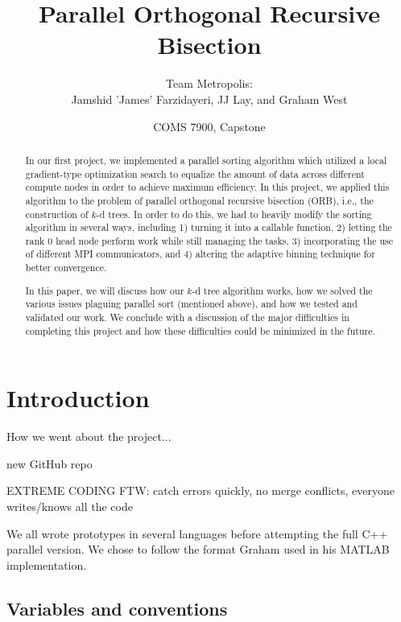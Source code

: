 \documentclass{article}
\begin{document}
\title{Parallel Orthogonal Recursive Bisection}
\author{Team Metropolis: \\
		Jamshid 'James' Farzidayeri, JJ Lay, and Graham West}
\date{COMS 7900, Capstone}

\maketitle

\begin{abstract}
In our first project, we implemented a parallel sorting algorithm which utilized a local gradient-type optimization search to equalize the amount of data across different compute nodes in order to achieve maximum efficiency. In this project, we applied this algorithm to the problem of parallel orthogonal recursive bisection (ORB), i.e., the construction of $k$-d trees. In order to do this, we had to heavily modify the sorting algorithm in several ways, including 1) turning it into a callable function, 2) letting the rank 0 head node perform work while still managing the tasks, 3) incorporating the use of different MPI communicators, and 4) altering the adaptive binning technique for better convergence.

In this paper, we will discuss how our $k$-d tree algorithm works, how we solved the various issues plaguing parallel sort (mentioned above), and how we tested and validated our work. We conclude with a discussion of the major difficulties in completing this project and how these difficulties could be minimized in the future.
\end{abstract}


\tableofcontents


\section{Introduction}
How we went about the project...

new GitHub repo

EXTREME CODING FTW: catch errors quickly, no merge conflicts, everyone writes/knows all the code

We all wrote prototypes in several languages before attempting the full C++ parallel version. We chose to follow the format Graham used in his MATLAB implementation.

\subsection{Variables and conventions}
\end{document}
